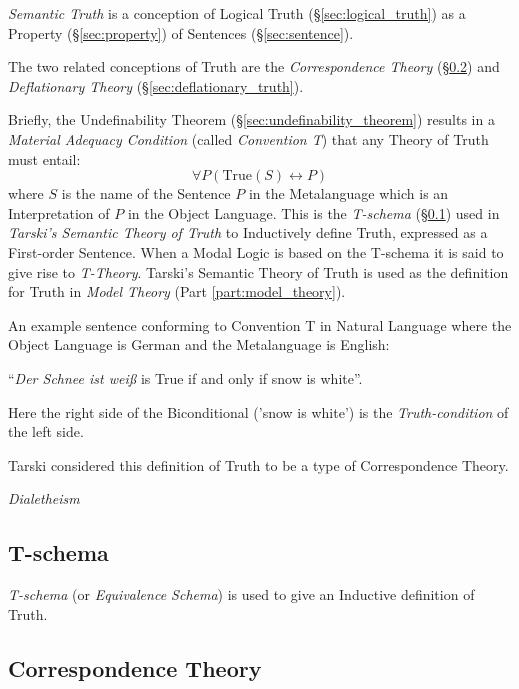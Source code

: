 \emph{Semantic Truth} is a conception of Logical Truth
(\S\ref{sec:logical_truth}) as a Property (\S\ref{sec:property}) of
Sentences (\S\ref{sec:sentence}).

The two related conceptions of Truth are the \emph{Correspondence
  Theory} (\S\ref{sec:correspondence_truth}) and \emph{Deflationary
  Theory} (\S\ref{sec:deflationary_truth}).

Briefly, the Undefinability Theorem
(\S\ref{sec:undefinability_theorem}) results in a \emph{Material
  Adequacy Condition} (called \emph{Convention T}) that any Theory of
Truth must entail:
\[
    \forall P (\mathrm{True}(S) \leftrightarrow P)
\]
where $S$ is the name of the Sentence $P$ in the Metalanguage which is
an Interpretation of $P$ in the Object Language. This is the
\emph{T-schema} (\S\ref{sec:t_schema}) used in \emph{Tarski's Semantic
  Theory of Truth} to Inductively define Truth, expressed as a
First-order Sentence. When a Modal Logic is based on the T-schema it
is said to give rise to \emph{T-Theory}. Tarski's Semantic Theory of
Truth is used as the definition for Truth in \emph{Model Theory}
(Part \ref{part:model_theory}).

An example sentence conforming to Convention T in Natural Language
where the Object Language is German and the Metalanguage is English:
\begin{description}
  \item ``\emph{Der Schnee ist wei\ss} is True if and only if snow is
    white''.
\end{description}
Here the right side of the Biconditional ('snow is white') is the
\emph{Truth-condition} of the left side.

Tarski considered this definition of Truth to be a type of
Correspondence Theory.

\emph{Dialetheism}



\subsection{T-schema}\label{sec:t_schema}

\emph{T-schema} (or \emph{Equivalence Schema}) is used to give an
Inductive definition of Truth.



\subsection{Correspondence Theory}\label{sec:correspondence_truth}

